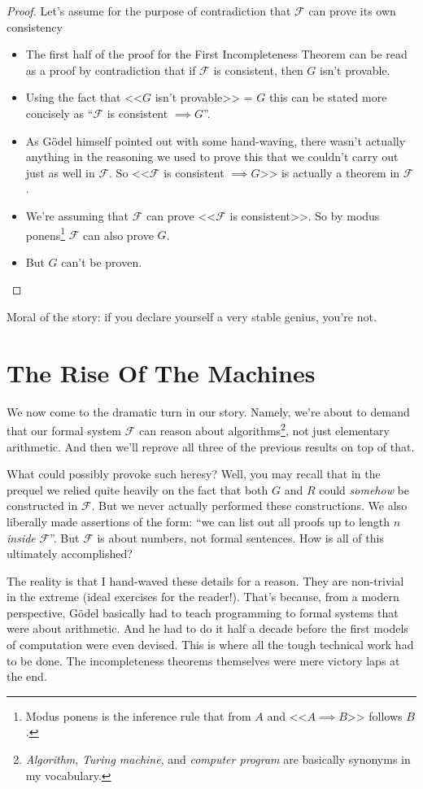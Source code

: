 \documentclass{article}
\newcommand{\F}{\ensuremath{\mathcal{F}}}
\begin{document}
\begin{proof}
Let's assume for the purpose of contradiction that $\F$ can prove its own consistency
\begin{itemize}
\item The first half of the proof for the First Incompleteness Theorem can be read as a proof by contradiction that if $\F$ is consistent, then $G$ isn't provable.
\item Using the fact that <<$G$ isn't provable>> = $G$ this can be stated more concisely as ``$\F$ is consistent $\implies G$''.
\item As Gödel himself pointed out with some hand-waving, there wasn't actually anything in the reasoning we used to prove this that we couldn't carry out just as well in $\F$. So <<$\F$ is consistent $\implies G$>> is actually a theorem in $\F$.
\item We're assuming that $\F$ can prove <<$\F$ is consistent>>. So by modus ponens\footnote{Modus ponens is the inference rule that from $A$ and <<$A \implies B$>> follows $B$.} $\F$ can also prove $G$.
\item But $G$ can't be proven. \lightning
\end{itemize}
\end{proof}

Moral of the story: if you declare yourself a very stable genius, you're not.\cite{trump}

\section{The Rise Of The Machines}

We now come to the dramatic turn in our story. Namely, we're about to demand that our formal system $\F$ can reason about algorithms\footnote{\textit{Algorithm}, \textit{Turing machine}, and \textit{computer program} are basically synonyms in my vocabulary.}, not just elementary arithmetic. And then we'll reprove all three of the previous results on top of that.

What could possibly provoke such heresy? Well, you may recall that in the prequel we relied quite heavily on the fact that both $G$ and $R$ could \textit{somehow} be constructed in $\F$. But we never actually performed these constructions. We also liberally made assertions of the form: ``we can list out all proofs up to length $n$ \textit{inside} $\F$''. But $\F$ is about numbers, not formal sentences. How is all of this ultimately accomplished?

The reality is that I hand-waved these details for a reason. They are non-trivial in the extreme (ideal exercises for the reader!). That's because, from a modern perspective, Gödel basically had to teach programming to formal systems that were about arithmetic. And he had to do it half a decade before the first models of computation were even devised. This is where all the tough technical work had to be done. The incompleteness theorems themselves were mere victory laps at the end.
\end{document}
